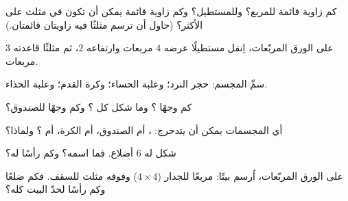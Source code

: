 \begin{exercise}[$\star$]\label{exo:g2:shapes:4}
كم زاوية قائمة للمربع؟ وللمستطيل؟ وكم زاوية قائمة يمكن أن تكون
في مثلث على الأكثر؟ (حاول أن ترسم مثلثًا فيه زاويتان قائمتان.)
\end{exercise}

\begin{exercise}[$\star$]\label{exo:g2:shapes:5}
على الورق المربّعات، اِنقل مستطيلًا عرضه $4$ مربعات وارتفاعه $2$،
ثم مثلثًا قاعدته $3$ مربعات.
\end{exercise}

\begin{exercise}[$\star$]\label{exo:g2:shapes:6}
سمِّ المجسم: حجر النرد؛ وعلبة الحساء؛ وكرة القدم؛ وعلبة الحذاء.
\end{exercise}

\begin{exercise}[$\star$]\label{exo:g2:shapes:7}
كم وجهًا ؟ وما شكل كل ؟ وكم وجهًا
للصندوق؟
\end{exercise}

\begin{exercise}[$\star$]\label{exo:g2:shapes:8}
أي المجسمات يمكن أن يتدحرج: ، أم الصندوق، أم الكرة، أم ؟
ولماذا؟
\end{exercise}

\begin{exercise}[$\star$]\label{exo:g2:shapes:9}
شكل له $6$ أضلاع. فما اسمه؟ وكم رأسًا له؟
\end{exercise}

\begin{exercise}[$\star\star$]\label{exo:g2:shapes:10}
على الورق المربّعات، اُرسم بيتًا: مربعًا للجدار
($4 \times 4$) وفوقه مثلث للسقف. فكم ضلعًا وكم رأسًا لحدّ البيت
كله؟
\end{exercise}
